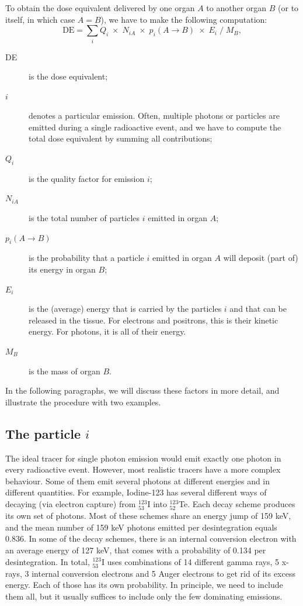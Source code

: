 \documentclass[11pt,oneside]{article}
\begin{document}
To obtain the dose equivalent delivered by one organ $A$ to another organ $B$
(or to itself, in which case $A = B$), we have to make the following
computation:
\begin{equation}
  \mbox{DE} = \sum_i Q_i \;\times\; N_{iA} \;\times\; p_i(A \rightarrow B) 
               \;\times\; E_i \;/\; M_B, \label{eq:DE}
\end{equation}
\begin{description}
  \item[DE] is the dose equivalent;

  \item[$i$] denotes a particular emission. Often, multiple photons or
            particles are emitted during a single radioactive event, and we
            have to compute the total dose equivalent by summing all
            contributions;

  \item[$Q_i$] is the quality factor for emission $i$;

  \item[$N_{iA}$] is the total number of particles $i$ emitted in organ $A$;

  \item[$p_i(A \rightarrow B)$] is the probability that a particle $i$ emitted
       in organ $A$ will deposit (part of) its energy in organ $B$;

  \item[$E_i$] is the (average) energy that is carried by the particles $i$ and
       that can be released in the tissue. For electrons and positrons, this is
       their kinetic energy. For photons, it is all of their energy.

  \item[$M_B$] is the mass of organ $B$.
\end{description}
In the following paragraphs, we will discuss these factors in more detail, and
illustrate the procedure with two examples.

\subsection{The particle $i$}
The ideal tracer for single photon emission would emit exactly one photon in
every radioactive event. However, most realistic tracers have a more complex
behaviour. Some of them emit several photons at different energies and in
different quantities. For example, Iodine-123 has several different ways of
decaying (via electron capture) from $^{123}_{53}$I into $^{123}_{52}$Te.
Each decay scheme produces its
own set of photons. Most of these schemes share an energy jump of 159 keV, and
the mean number of 159 keV photons emitted per desintegration equals
0.836. In some of the decay schemes, there is an internal conversion electron
with an average energy of 127 keV, that comes with a probability of 0.134 per
desintegration. In total,
$^{123}_{53}$I uses combinations of 14 different gamma rays, 5 x-rays, 3
internal conversion electrons and 5 Auger electrons to get rid of its excess
energy. Each of those has its own probability. In principle, we need to
include them all, but it usually suffices to include only the few dominating
emissions.
\end{document}

